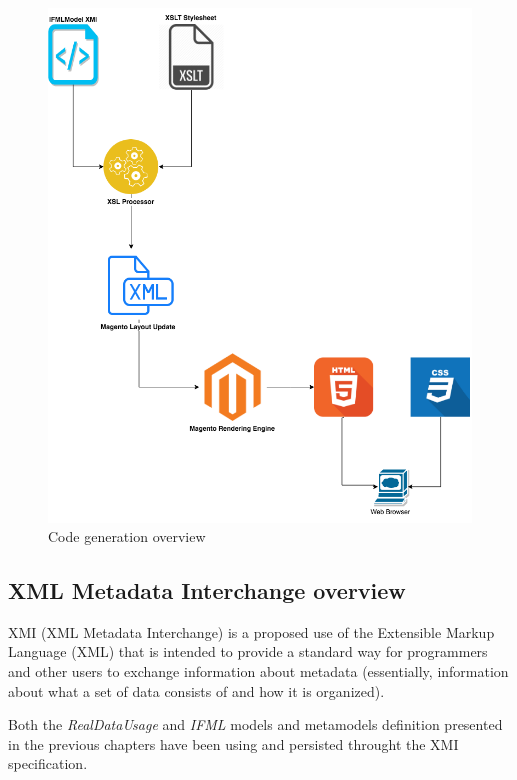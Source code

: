 \vspace{0.5cm}
\begin{figure}[H]
  \centering
    \includegraphics[width=14cm]{images/code-generation.png}
  \caption{Code generation overview}
  \label{fig:code-generation}
\end{figure}
\vspace{0.5cm}

\subsection{XML Metadata Interchange overview}

XMI (XML Metadata Interchange) is a proposed use of the Extensible Markup Language (XML) that is intended to provide a standard way for programmers and other users to exchange information about metadata (essentially, information about what a set of data consists of and how it is organized)\cite{xmi}. 

Both the \textit{RealDataUsage} and \textit{IFML} models and metamodels definition presented in the previous chapters have been using and persisted throught the XMI specification.

